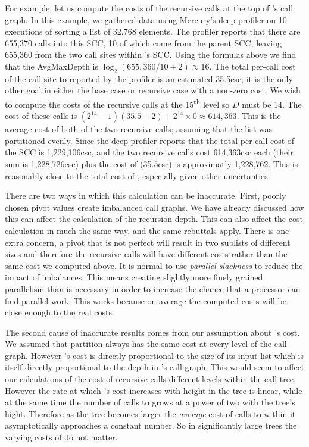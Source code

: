 For example, let us compute the costs of the recursive calls at the top of
\quicksortacc's call graph.
In this example, we gathered data using Mercury's deep profiler on 10
executions of \quicksortacc sorting a list of 32,768 elements.
The profiler reports that there are 655,370 calls into this SCC,
10 of which come from the parent SCC, leaving 655,360 from the two call sites
within \quicksortacc's SCC.
Using the formulas above we find that the AvgMaxDepth is
$\log_{2}(655,360/10 + 2) \approx 16$.
The total per-call cost of the call site to \partition reported by the profiler
is an estimated 35.5csc,
it is the only other goal in either the base case or recursive case with a
non-zero cost.
We wish to compute the costs of the recursive calls at the
15\textsuperscript{th} level so $D$ must be 14.
The cost of these calls is
$(2^{14} - 1)(35.5 + 2) + 2^{14}\times0 \approx 614,363$.
This is the average cost of both of the two recursive calls;
assuming that the list was partitioned evenly.
Since the deep profiler reports that the total per-call cost of the
\quicksortacc SCC is 1,229,106csc, 
and the two recursive calls cost 614,363csc each (their sum is 1,228,726csc)
plus the cost of \partition (35.5csc) is approximatly 1,228,762.
This is reasonably close to the total cost of \quicksortacc,
especially given other uncertanties.

There are two ways in which this calculation can be inaccurate.
First, poorly chosen pivot values create imbalanced call graphs.
We have already discussed how this can affect the calculation of the
recursion depth.
This can also affect the cost calculation in much the same way,
and the same rebuttals apply.
There is one extra concern,
a pivot that is not perfect will result in two sublists of different sizes
and therefore the recursive calls will have different costs rather than the
same cost we computed above.
It is normal to use \emph{parallel slackness} to reduce the impact of
imbalances.
This means creating slightly more finely grained parallelism than is
necessary in order to increase the chance that a processor can find parallel
work.
This works because on average the computed costs will be close enough to the
real costs.

The second cause of inaccurate results comes from our assumption about
\partition's cost.
We assumed that partition always has the same cost at every level of
the call graph.
However \partition's cost is directly proportional to the size of its input
list which is itself directly proportional to the depth in \quicksortacc's call
graph.
This would seem to affect our calculations of the cost of recursive calls
different levels within the call tree.
However the rate at which \partition's cost increases with height in the tree
is linear, while at the same time the number of calls to \partition grows at
a power of two with the tree's hight.
Therefore as the tree becomes larger the \emph{average} cost of calls to
\partition within it asymptotically approaches a constant number.
So in significantly large trees the varying costs of \partition do not
matter.

